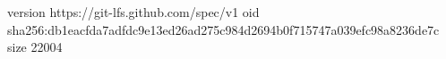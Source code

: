 version https://git-lfs.github.com/spec/v1
oid sha256:db1eacfda7adfdc9e13ed26ad275c984d2694b0f715747a039efc98a8236de7c
size 22004
